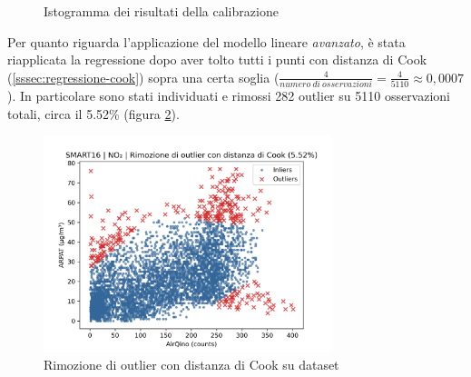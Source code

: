 \begin{figure}[H]%
    \centering
    \captionsetup{justification=centering}
    \caption{Istogramma dei risultati della calibrazione }%
    \label{fig:risultati-no2-hist}%
\end{figure}

Per quanto riguarda l'applicazione del modello lineare \textit{avanzato}, è stata riapplicata la regressione dopo aver tolto tutti i punti con distanza di Cook (\ref{sssec:regressione-cook}) sopra una certa soglia ($\frac{4}{numero\ di\ osservazioni} = \frac{4}{5110} \approx 0,0007$). In particolare sono stati individuati e rimossi 282 outlier su 5110 osservazioni totali, circa il 5.52\% (figura \ref{fig:cook-no2}).

\begin{figure}[H]
\centering
\includegraphics[width=0.75\textwidth,height=\textheight,keepaspectratio]{img/cook_no2.png}
\caption{Rimozione di outlier con distanza di Cook su dataset }%
\label{fig:cook-no2}%
\end{figure}

